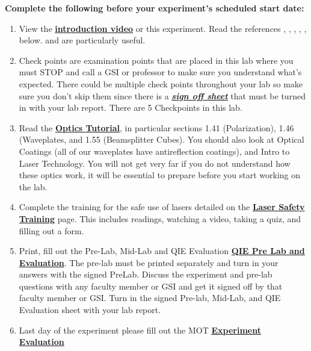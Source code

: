 \documentclass{../lab}
\begin{document}
\textbf{Complete the following before your experiment's scheduled start date:}

\begin{enumerate}
    \item View the\textbf{ }\href{http://experimentationlab.berkeley.edu/sites/default/files/QIE/qie\_introduction\_final2.mp4}{\textbf{introduction video}} or this experiment. Read the references \cite{Dehlinger}, \cite{Bell}, \cite{Clauser}, \cite{Walborn}, \cite{Lukishova}, \cite{Fox} below. \cite{Dehlinger} and \cite{Lukishova} are particularly useful.

    \item Check points are examination points that are placed in this lab where you must STOP and call a GSI or professor to make sure you understand what's expected. There could  be multiple check points throughout your lab so make sure you don't skip them since there is a \emph{\href{http://experimentationlab.berkeley.edu/qiecheckpoints}{\textbf{sign off sheet}}} that must be turned in with your lab report. There are 5 Checkpoints in this lab.

    \item Read the \href{http://experimentationlab.berkeley.edu/sites/default/files/QIE/fundamental-Optics.pdf}{\textbf{Optics Tutorial}}, in particular sections 1.41 (Polarization), 1.46 (Waveplates, and 1.55 (Beamsplitter Cubes). You should also look at Optical Coatings (all of our waveplates have antireflection coatings), and Intro to Laser Technology. You will not get very far if you do not understand how these optics work, it will be essential to prepare before you start working on the lab.

    \item Complete the training for the safe use of lasers detailed on the \href{http://experimentationlab.berkeley.edu/lasersafety}{\textbf{\textbf{Laser Safety Training}}} page. This includes readings, watching a video, taking a quiz, and filling out a form.

    \item Print, fill out the Pre-Lab, Mid-Lab and QIE Evaluation \href{http://experimentationlab.berkeley.edu/qieprelab}{\textbf{QIE Pre Lab and Evaluation}}. The pre-lab must be printed separately and turn in your answers with the signed PreLab. Discuss the experiment and pre-lab questions with any faculty member or GSI and get it signed off by that faculty member or GSI. Turn in the signed Pre-lab, Mid-Lab, and QIE Evaluation sheet with your lab report.

    \item Last day of the experiment please fill out the MOT  \href{\ExperimentEvaluation}{\textbf{Experiment Evaluation}}

\end{enumerate}
\end{document}
